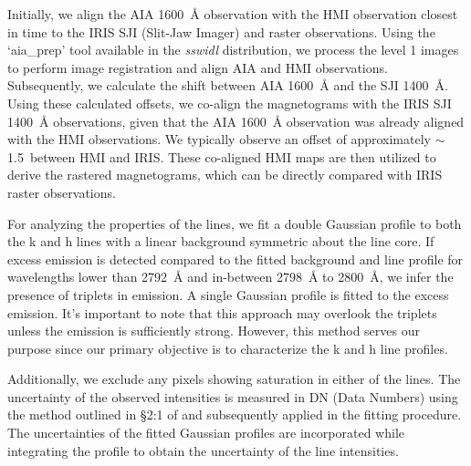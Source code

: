 Initially, we align the AIA 1600~{\AA} observation with the HMI observation closest in time to the IRIS SJI (Slit-Jaw Imager) and raster observations. Using the `aia\_prep' tool available in the \textit{sswidl} distribution, we process the level 1 images to perform image registration and align AIA and HMI observations. Subsequently, we calculate the shift between AIA 1600~{\AA} and the SJI 1400~{\AA}. Using these calculated offsets, we co-align the magnetograms with the IRIS SJI 1400~{\AA} observations, given that the AIA 1600~{\AA} observation was already aligned with the HMI observations. We typically observe an offset of approximately $\sim$ 1.5\arcsec~between HMI and IRIS. These co-aligned HMI maps are then utilized to derive the rastered magnetograms, which can be directly compared with IRIS raster observations.

For analyzing the properties of the   lines, we fit a double Gaussian profile to both the k and h lines with a linear background symmetric about the line core. If excess emission is detected compared to the fitted background and line profile for wavelengths lower than 2792~{\AA} and in-between 2798~{\AA} to 2800~{\AA}, we infer the presence of   triplets in emission. A single Gaussian profile is fitted to the excess emission. It's important to note that this approach may overlook the triplets unless the emission is sufficiently strong. However, this method serves our purpose since our primary objective is to characterize the   k and h line profiles.

Additionally, we exclude any pixels showing saturation in either of the lines. The uncertainty of the observed intensities is measured in DN (Data Numbers) using the method outlined in \S 2:1 of \cite{kerr15} and subsequently applied in the fitting procedure. The uncertainties of the fitted Gaussian profiles are incorporated while integrating the profile to obtain the uncertainty of the line intensities.

